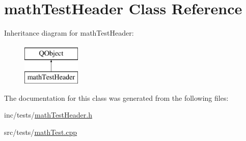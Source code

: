 \hypertarget{classmathTestHeader}{\section{math\-Test\-Header Class Reference}
\label{classmathTestHeader}
}
Inheritance diagram for math\-Test\-Header\-:\begin{figure}[H]
\begin{center}
\leavevmode
\includegraphics[height=2.000000cm]{classmathTestHeader}
\end{center}
\end{figure}


The documentation for this class was generated from the following files\-:\begin{DoxyCompactItemize}
\item 
inc/tests/\hyperlink{mathTestHeader_8h}{math\-Test\-Header.\-h}\item 
src/tests/\hyperlink{mathTest_8cpp}{math\-Test.\-cpp}\end{DoxyCompactItemize}
